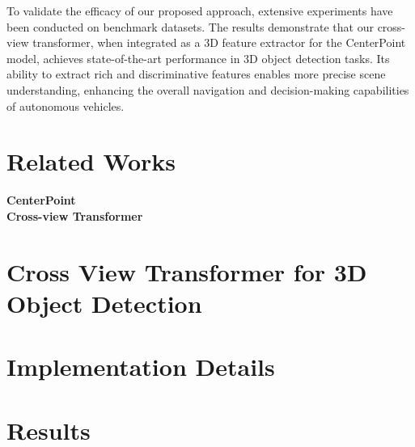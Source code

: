 \documentclass[]{article}
\begin{document}
To validate the efficacy of our proposed approach, extensive experiments have been conducted on benchmark datasets. The results demonstrate that our cross-view transformer, when integrated as a 3D feature extractor for the CenterPoint model, achieves state-of-the-art performance in 3D object detection tasks. Its ability to extract rich and discriminative features enables more precise scene understanding, enhancing the overall navigation and decision-making capabilities of autonomous vehicles.

\section{Related Works}
\textbf{CenterPoint}
\\
\textbf{Cross-view Transformer}

\section{Cross View Transformer for 3D Object Detection}

\section{Implementation Details}

\section{Results}



\end{document}
